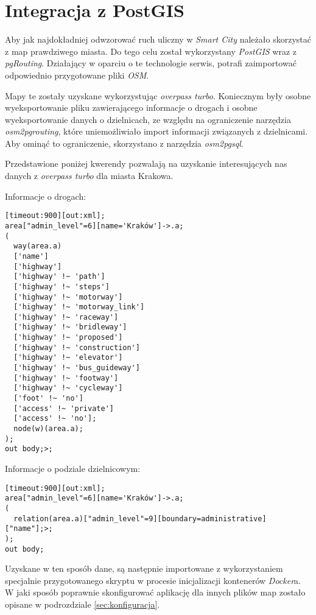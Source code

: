 \section{Integracja z PostGIS}
\label{sec:integracjaZPostGIS}

\par Aby jak najdokładniej odwzorować ruch uliczny w \emph{Smart City} należało skorzystać z map prawdziwego miasta. Do tego celu został wykorzystany \emph{PostGIS}\cite{POSTGIS_SITE} wraz z \emph{pgRouting}\cite{PGROUTING_SITE}. Działający w oparciu o te technologie serwis, potrafi zaimportować odpowiednio przygotowane pliki \emph{OSM}.

\par Mapy te zostały uzyskane wykorzystując \emph{overpass turbo}\cite{OVERPASS_TURBO_SITE}. Koniecznym były osobne wyeksportowanie pliku zawierającego informacje o drogach i osobne wyeksportowanie danych o dzielnicach, ze względu na ograniczenie narzędzia \emph{osm2pgrouting}\cite{OSM2PGROUTING_GITHUB}, które uniemożliwiało import informacji związanych z dzielnicami. Aby ominąć to ograniczenie, skorzystano z narzędzia \emph{osm2pgsql}\cite{OSM2PGSQL_GITHUB}.

\par Przedstawione poniżej kwerendy pozwalają na uzyskanie interesujących nas danych z \emph{overpass turbo} dla miasta Krakowa.

Informacje o drogach:
\begin{verbatim}
[timeout:900][out:xml];
area["admin_level"=6][name='Kraków']->.a;
(
  way(area.a)
  ['name']
  ['highway']
  ['highway' !~ 'path']
  ['highway' !~ 'steps']
  ['highway' !~ 'motorway']
  ['highway' !~ 'motorway_link']
  ['highway' !~ 'raceway']
  ['highway' !~ 'bridleway']
  ['highway' !~ 'proposed']
  ['highway' !~ 'construction']
  ['highway' !~ 'elevator']
  ['highway' !~ 'bus_guideway']
  ['highway' !~ 'footway']
  ['highway' !~ 'cycleway']
  ['foot' !~ 'no']
  ['access' !~ 'private']
  ['access' !~ 'no'];
  node(w)(area.a);
);
out body;>;
\end{verbatim}

Informacje o podziale dzielnicowym:
\begin{verbatim}
[timeout:900][out:xml];
area["admin_level"=6][name='Kraków']->.a;
(
  relation(area.a)["admin_level"=9][boundary=administrative]["name"];>;
);
out body;
\end{verbatim}

\par Uzyskane w ten sposób dane, są następnie importowane z wykorzystaniem specjalnie przygotowanego skryptu w procesie inicjalizacji kontenerów \emph{Docker}a. W jaki sposób poprawnie skonfigurować aplikację dla innych plików map zostało opisane w podrozdziale \ref{sec:konfiguracja}.

